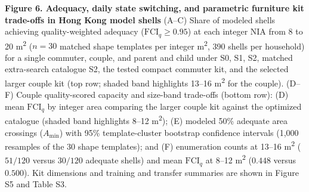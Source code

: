 \documentclass[12pt,letterpaper]{article}
\begin{document}
\textbf{Figure 6. Adequacy, daily state switching, and parametric furniture kit trade-offs in Hong Kong model shells} (A--C) Share of modeled shells achieving quality-weighted adequacy (\(\text{FCI}_q \ge 0.95\)) at each integer NIA from 8 to 20 m\textsuperscript{2} (\(n = 30\) matched shape templates per integer m\textsuperscript{2}, 390 shells per household) for a single commuter, couple, and parent and child under S0, S1, S2, matched extra-search catalogue S2, the tested compact commuter kit, and the selected larger couple kit (top row; shaded band highlights 13--16 m\textsuperscript{2} for the couple). (D--F) Couple quality-scored capacity and size-band trade-offs (bottom row): (D) mean \(\text{FCI}_q\) by integer area comparing the larger couple kit against the optimized catalogue (shaded band highlights 8--12 m\textsuperscript{2}); (E) modeled 50\% adequate area crossings (\(A_{\min}\)) with 95\% template-cluster bootstrap confidence intervals (1,000 resamples of the 30 shape templates); and (F) enumeration counts at 13--16 m\textsuperscript{2} (\(51/120\) versus \(30/120\) adequate shells) and mean \(\text{FCI}_q\) at 8--12 m\textsuperscript{2} (\(0.448\) versus \(0.500\)). Kit dimensions and training and transfer summaries are shown in Figure S5 and Table S3.
\end{document}

